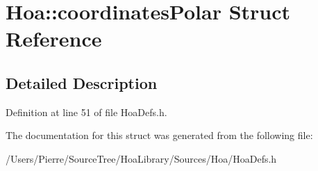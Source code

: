 \hypertarget{struct_hoa_1_1coordinates_polar}{\section{Hoa\-:\-:coordinates\-Polar Struct Reference}
\label{struct_hoa_1_1coordinates_polar}
}


\subsection{Detailed Description}


Definition at line 51 of file Hoa\-Defs.\-h.



The documentation for this struct was generated from the following file\-:\begin{DoxyCompactItemize}
\item 
/\-Users/\-Pierre/\-Source\-Tree/\-Hoa\-Library/\-Sources/\-Hoa/Hoa\-Defs.\-h\end{DoxyCompactItemize}

